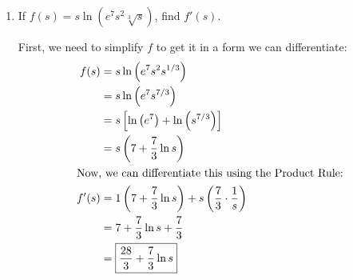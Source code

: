 \documentclass{article}
\theoremstyle{theorem}
\begin{document}
\begin{enumerate}
\begin{enumerate}
    \begin{solution}
      Since $w$ is inside $\log_3$, a good first step is to raise 3 to both sides:
      \begin{align*}
        3^{2 \log_3 (w + 4)} &= 3^{\log_3(2 - w) + 1} \\
        \intertext{Using exponent rules, we can rewrite this as:}
        \left( 3^{\log_3 (w + 4)} \right)^2 &= 3^{\log_3(2 - w)} \cdot 3^1 \\
        (w + 4)^2 &= (2 - w) 3 \\
        \intertext{This isn't linear, so we'll move everything to one side:}
        w^2 + 8w + 16 &= 6 - 3w \\
        w^2 + 11w + 10 &= 0 \\
        (w + 1)(w + 10) &= 0 \\
        w &= -1, -10
      \end{align*}
      Since the original equation involved logs, we should check whether our solutions are in the domain of the equation.
      \begin{itemize}
      \item Plugging $w = -1$ into the original equation gives $2 \log_3(3) = \log_3(3) + 1$. All of the logs are defined (and we can see the equation is true.)
      \item Plugging $w = -10$ into the original equation gives $\log_3(-6) = \log_3(12) + 1$. Since $\log_3(-6)$ isn't defined, $w = -10$ isn't actually a solution.
      \end{itemize}
      So, the only solution is $\boxed{-1}$. 
    \end{solution}

  \item

      \begin{problem}[\vfill]
        If $f(s)=s\ln(e^7 s^2 \sqrt[3]{s})$, find $f'(s)$. 
      \end{problem}

      \begin{solution}
        First, we need to simplify $f$ to get it in a form we can differentiate:
        \begin{align*}
          f(s) &= s \ln \left( e^7 s^2 s^{1/3} \right) \\
          &= s \ln \left( e^7 s^{7/3} \right) \\
          &= s \left[ \ln \left( e^7 \right) + \ln \left( s^{7/3} \right) \right] \\
          &= s \left( 7 + \frac{7}{3} \ln s \right) \\
          \intertext{Now, we can differentiate this using the Product Rule:}
          f'(s) &= 1 \left( 7 + \frac{7}{3} \ln s \right) + s \left( \frac{7}{3} \cdot \frac{1}{s} \right) \\
          &= 7 + \frac{7}{3} \ln s + \frac{7}{3} \\
          &= \boxed{\frac{28}{3} + \frac{7}{3} \ln s}
        \end{align*}
      \end{solution}


\end{enumerate}
\end{enumerate}
\end{document}

